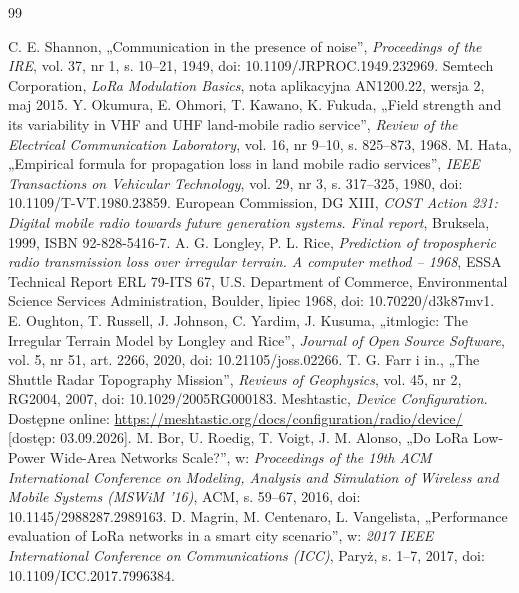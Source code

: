 \documentclass[12pt,a4paper,twoside]{report}
\theoremstyle{definition} %
\begin{document}
    \begin{thebibliography}{99}
     C. E. Shannon, „Communication in the presence of noise”, \emph{Proceedings of the IRE}, vol. 37, nr 1, s. 10--21, 1949, doi: 10.1109/JRPROC.1949.232969.
     Semtech Corporation, \emph{LoRa Modulation Basics}, nota aplikacyjna AN1200.22, wersja 2, maj 2015.
     Y. Okumura, E. Ohmori, T. Kawano, K. Fukuda, „Field strength and its variability in VHF and UHF land-mobile radio service”, \emph{Review of the Electrical Communication Laboratory}, vol. 16, nr 9--10, s. 825--873, 1968.
     M. Hata, „Empirical formula for propagation loss in land mobile radio services”, \emph{IEEE Transactions on Vehicular Technology}, vol. 29, nr 3, s. 317--325, 1980, doi: 10.1109/T-VT.1980.23859.
     European Commission, DG XIII, \emph{COST Action 231: Digital mobile radio towards future generation systems. Final report}, Bruksela, 1999, ISBN 92-828-5416-7.
     A. G. Longley, P. L. Rice, \emph{Prediction of tropospheric radio transmission loss over irregular terrain. A computer method -- 1968}, ESSA Technical Report ERL 79-ITS 67, U.S. Department of Commerce, Environmental Science Services Administration, Boulder, lipiec 1968, doi: 10.70220/d3k87mv1.
     E. Oughton, T. Russell, J. Johnson, C. Yardim, J. Kusuma, „itmlogic: The Irregular Terrain Model by Longley and Rice”, \emph{Journal of Open Source Software}, vol. 5, nr 51, art. 2266, 2020, doi: 10.21105/joss.02266.
     T. G. Farr i in., „The Shuttle Radar Topography Mission”, \emph{Reviews of Geophysics}, vol. 45, nr 2, RG2004, 2007, doi: 10.1029/2005RG000183.
     Meshtastic, \emph{Device Configuration}. Dostępne online: \url{https://meshtastic.org/docs/configuration/radio/device/} [dostęp: 03.09.2026].
     M. Bor, U. Roedig, T. Voigt, J. M. Alonso, „Do LoRa Low-Power Wide-Area Networks Scale?”, w: \emph{Proceedings of the 19th ACM International Conference on Modeling, Analysis and Simulation of Wireless and Mobile Systems (MSWiM '16)}, ACM, s. 59--67, 2016, doi: 10.1145/2988287.2989163.
     D. Magrin, M. Centenaro, L. Vangelista, „Performance evaluation of LoRa networks in a smart city scenario”, w: \emph{2017 IEEE International Conference on Communications (ICC)}, Paryż, s. 1--7, 2017, doi: 10.1109/ICC.2017.7996384.

\end{thebibliography}
\end{document}

